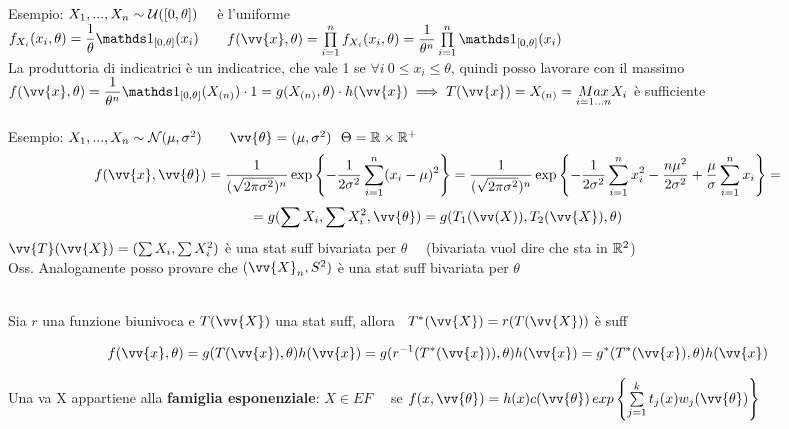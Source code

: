 Esempio: $X_1,...,X_n \sim \mathcal U([0,\theta])$ \ \ è l'uniforme\\
$f_{X_i}(x_i,\theta)=\frac{1}{\theta}\II_{[0,\theta]}(x_i)$ \ \ \ $f(\vv{x},\theta)=\Prod{i=1}{n}f_{X_i}(x_i,\theta)= \frac{1}{\theta^n} \Prod{i=1}{n}\II_{[0,\theta]}(x_i)$ \\ La produttoria di indicatrici è un indicatrice, che vale 1 se $\forall i \ 0\le x_i \le \theta$, quindi posso lavorare con il massimo\\
$f(\vv{x},\theta) = \frac{1}{\theta^n} \II_{[0,\theta]}(X_{(n)})\cdot 1 = g(X_{(n)},\theta) \cdot h(\vv{x}) \implies T(\vv{x})=X_{(n)} = \underset{i=1...n}{Max}X_i$ è sufficiente\\ \\

Esempio: $X_1,...,X_n \sim \mathcal N (\mu,\sigma^2)$ \ \ \ $\vv{\theta}=(\mu,\sigma^2) \ \ \Theta=\R\times\R^+$
\[f(\vv{x},\vv{\theta})=\frac{1}{(\sqrt{2\pi\sigma^2})^n} \exp \left\{-\frac{1}{2\sigma^2} \sum_{i=1}^n (x_i -\mu)^2\right\} = \frac{1}{(\sqrt{2\pi\sigma^2})^n} \exp \left\{-\frac{1}{2\sigma^2} \sum_{i=1}^n x_i^2 -\frac{n\mu^2}{2\sigma^2} + \frac{\mu}{\sigma}\sum_{i=1}^n x_i\right\} = \] \[ =g(\sum X_i, \sum X_i^2, \vv{\theta}) = g(T_1(\vv(X)), T_2(\vv{X}),\theta)\]  $\vv{T}(\vv{X})=(\sum X_i, \sum X_i^2)$ è una stat suff bivariata per $\theta$ \ \ (bivariata vuol dire che sta in $\mathbb R^2$)\\ 

Oss. Analogamente posso provare che $(\vv{X}_n, S^2)$ è una stat suff bivariata per $\theta$\\ \\



\begin{teo}
Sia $r$ una funzione biunivoca e $T(\vv{X})$ una stat suff, allora \ $T^*(\vv{X}) = r(T(\vv{X}))$ è suff
\end{teo}

\begin{Dim} \[f(\vv{x},\theta)=g(T(\vv{x}),\theta)h(\vv{x})=g(r^{-1}(T^*(\vv{x})),\theta)h(\vv{x})=g^*(T^*(\vv{x}),\theta)h(\vv{x})\]
\end{Dim}

\phantom{}



\begin{defi}
    Una va X appartiene alla \textbf{famiglia esponenziale}: $X\in EF$ \ \ se $f(x,\vv{\theta})=h(x)c(\vv{\theta}) \,exp \OOO \Sum{j=1}{k} t_j(x)w_j(\vv{\theta})\CCC$
\end{defi}

